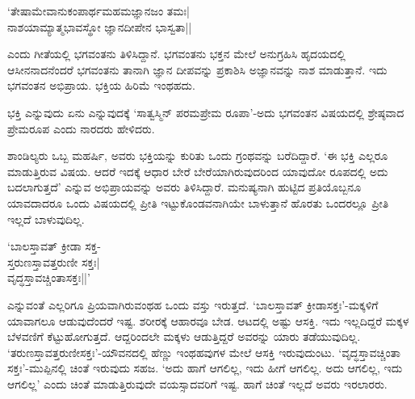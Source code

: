 \begin{shloka}
`ತೇಷಾಮೇವಾನುಕಂಪಾರ್ಥಮಹಮಜ್ಞಾನಜಂ ತಮಃ|\\
ನಾಶಯಾಮ್ಯಾತ್ಮಭಾವಸ್ಥೋ ಜ್ಞಾನದೀಪೇನ ಭಾಸ್ವತಾ||
\end{shloka}

ಎಂದು ಗೀತೆಯಲ್ಲಿ ಭಗವಂತನು 
ತಿಳಿಸಿದ್ದಾನೆ. ಭಗವಂತನು 
ಭಕ್ತನ ಮೇಲೆ ಅನುಗ್ರಹಿಸಿ 
ಹೃದಯದಲ್ಲಿ ಆಸೀನನಾದನೆಂದರೆ 
ಭಗವಂತನು ತಾನಾಗಿ ಜ್ಞಾನ 
ದೀಪವನ್ನು ಪ್ರಕಾಶಿಸಿ 
ಅಜ್ಞಾನವನ್ನು ನಾಶ ಮಾಡುತ್ತಾನೆ. ಇದು ಭಗವಂತನ ಅಭಿಪ್ರಾಯ. ಭಕ್ತಿಯ ಹಿರಿಮೆ ಇಂಥಹದು.

ಭಕ್ತಿ ಎನ್ನುವುದು ಏನು 
ಎನ್ನುವುದಕ್ಕೆ `ಸಾತ್ವಸ್ಮಿನ್ 
ಪರಮಪ್ರೇಮ ರೂಪಾ'-ಅದು ಭಗವಂತನ 
ವಿಷಯದಲ್ಲಿ ಶ್ರೇಷ್ಠವಾದ ಪ್ರೇಮರೂಪ ಎಂದು ನಾರದರು ಹೇಳಿದರು.

ಶಾಂಡಿಲ್ಯರು ಒಬ್ಬ ಮಹರ್ಷಿ, 
ಅವರು ಭಕ್ತಿಯನ್ನು ಕುರಿತು 
ಒಂದು ಗ್ರಂಥವನ್ನು 
ಬರೆದಿದ್ದಾರೆ. `ಈ ಭಕ್ತಿ 
ಎಲ್ಲರೂ ಮಾಡುತ್ತಿರುವ ವಿಷಯ. 
ಆದರೆ ಇದಕ್ಕೆ ಆಧಾರ ಬೇರೆ 
ಬೇರೆಯಾಗಿರುವುದರಿಂದ ಯಾವುದೋ 
ರೂಪದಲ್ಲಿ ಅದು ಬದಲಾಗುತ್ತದೆ' 
ಎನ್ನುವ ಅಭಿಪ್ರಾಯವನ್ನು ಅವರು 
ತಿಳಿಸಿದ್ದಾರೆ. ಮನುಷ್ಯನಾಗಿ 
ಹುಟ್ಟಿದ ಪ್ರತಿಯೊಬ್ಬನೂ 
ಯಾವದಾದರೂ ಒಂದು ವಿಷಯದಲ್ಲಿ 
ಪ್ರೀತಿ ಇಟ್ಟುಕೊಂಡವನಾಗಿಯೇ 
ಬಾಳುತ್ತಾನೆ ಹೊರತು ಒಂದರಲ್ಲೂ ಪ್ರೀತಿ ಇಲ್ಲದೆ ಬಾಳುವುದಿಲ್ಲ.

\begin{shloka}
`ಬಾಲಸ್ತಾವತ್ ಕ್ರೀಡಾ ಸಕ್ತ-\\
ಸ್ತರುಣಸ್ತಾವತ್ತರುಣೀ ಸಕ್ತಃ|\\
ವೃದ್ಧಸ್ತಾವಚ್ಚಿಂತಾಸಕ್ತಃ||'
\end{shloka}

ಎನ್ನುವಂತೆ ಎಲ್ಲರಿಗೂ 
ಪ್ರಿಯವಾಗಿರುವಂಥಹ ಒಂದು 
ವಸ್ತು ಇರುತ್ತದೆ. 
`ಬಾಲಸ್ತಾವತ್ 
ಕ್ರೀಡಾಸಕ್ತಃ'-ಮಕ್ಕಳಿಗೆ 
ಯಾವಾಗಲೂ ಆಡುವುದೆಂದರೆ ಇಷ್ಟ. 
ಶರೀರಕ್ಕೆ ಆಹಾರವೂ ಬೇಡ. 
ಆಟದಲ್ಲಿ ಅಷ್ಟು ಆಸಕ್ತಿ. ಇದು 
ಇಲ್ಲದಿದ್ದರೆ ಮಕ್ಕಳ 
ಬೆಳವಣಿಗೆ ಕೆಟ್ಟುಹೋಗುತ್ತದೆ. 
ಆದ್ದರಿಂದಲೇ ಮಕ್ಕಳು 
ಆಡುತ್ತಿದ್ದರೆ ಅವರನ್ನು ಯಾರು 
ತಡೆಯುವುದಿಲ್ಲ. 
`ತರುಣಸ್ತಾವತ್ತರುಣೀಸಕ್ತಃ'-ಯೌವನದಲ್ಲಿ ಹೆಣ್ಣು ಇಂಥಹವುಗಳ ಮೇಲೆ ಆಸಕ್ತಿ ಇರುವುದುಂಟು. `ವೃದ್ಧಸ್ತಾವಚ್ಚಿಂತಾ ಸಕ್ತಃ'-ಮುಪ್ಪಿನಲ್ಲಿ ಚಿಂತೆ ಇರುವುದು ಸಹಜ. `ಅದು ಹಾಗೆ ಆಗಲಿಲ್ಲ, ಇದು ಹೀಗೆ ಆಗಲಿಲ್ಲ. ಅದು ಆಗಲಿಲ್ಲ, ಇದು ಆಗಲಿಲ್ಲ' ಎಂದು ಚಿಂತೆ ಮಾಡುತ್ತಿರುವುದೇ ವಯಸ್ಸಾದವರಿಗೆ ಇಷ್ಟ. ಹಾಗೆ ಚಿಂತೆ ಇಲ್ಲದೆ ಅವರು ಇರಲಾರರು.

